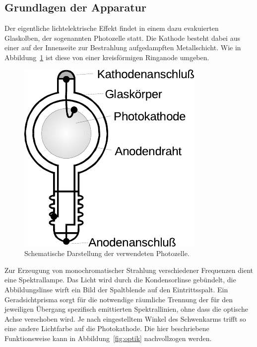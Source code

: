 \subsection{Grundlagen der Apparatur}

Der eigentliche lichtelektrische Effekt findet in einem dazu evakuierten Glaskolben, der sogenannten Photozelle statt. Die Kathode besteht
dabei aus einer auf der Innenseite zur Bestrahlung aufgedampften Metallschicht. Wie in Abbildung~\ref{fig:photozelle} ist diese von
einer kreisförmigen Ringanode umgeben.

\begin{figure}[H]
	\centering
	\hspace{12.5ex}
	\includegraphics[width=0.3\linewidth]{content/grafik/photozelle.pdf}
	\caption{Schematische Darstellung der verwendeten Photozelle.}
	\label{fig:photozelle}
\end{figure}

Zur Erzeugung von monochromatischer Strahlung verschiedener Frequenzen dient eine Spektrallampe. Das Licht wird durch die
Kondensorlinse gebündelt, die Abbildungslinse wirft ein Bild der Spaltblende auf den Eintrittsspalt. Ein Geradsichtprisma
sorgt für die notwendige räumliche Trennung der für den jeweiligen Übergang spezifisch emittierten Spektrallinien, ohne dass
die optische Achse verschoben wird. Je nach eingestelltem Winkel des Schwenkarms trifft so eine andere Lichtfarbe auf die Photokathode.
Die hier beschriebene Funktionsweise kann in Abbildung~\ref{fig:optik} nachvollzogen werden.

